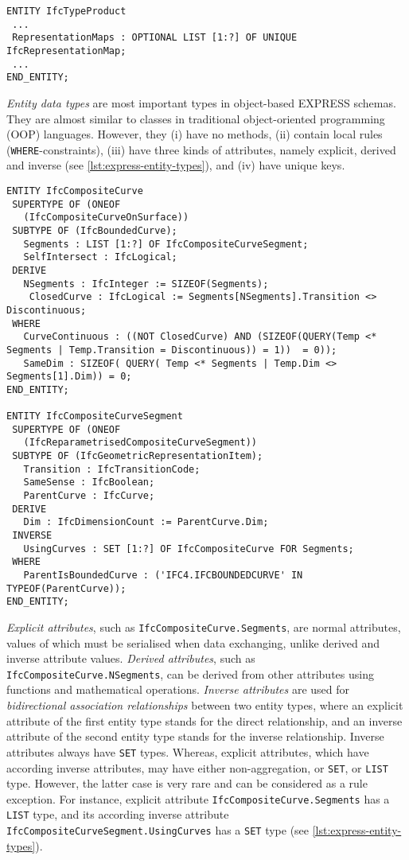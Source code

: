 \begin{lstlisting}[caption={Example of \texttt{LIST} type with unique items},label=lst:express-aggregation-types]
ENTITY IfcTypeProduct
 ...
 RepresentationMaps : OPTIONAL LIST [1:?] OF UNIQUE IfcRepresentationMap;
 ...	
END_ENTITY;
\end{lstlisting}



% 
% 
\emph{Entity data types} are most important types in object-based EXPRESS schemas.
They are almost similar to classes in traditional object-oriented programming (OOP) languages.
However, they (i) have no methods, (ii) contain local rules (\texttt{WHERE}-constraints), 
(iii) have three kinds of attributes, namely explicit, derived and inverse (see \autoref{lst:express-entity-types}),
and (iv) have unique keys.


\begin{lstlisting}[caption={Examples of EXPRESS entity types},label=lst:express-entity-types]
ENTITY IfcCompositeCurve
 SUPERTYPE OF (ONEOF
   (IfcCompositeCurveOnSurface))
 SUBTYPE OF (IfcBoundedCurve);
   Segments : LIST [1:?] OF IfcCompositeCurveSegment;
   SelfIntersect : IfcLogical;
 DERIVE
   NSegments : IfcInteger := SIZEOF(Segments);
	ClosedCurve : IfcLogical := Segments[NSegments].Transition <> Discontinuous;
 WHERE
   CurveContinuous : ((NOT ClosedCurve) AND (SIZEOF(QUERY(Temp <* Segments | Temp.Transition = Discontinuous)) = 1))  = 0));
   SameDim : SIZEOF( QUERY( Temp <* Segments | Temp.Dim <> Segments[1].Dim)) = 0;
END_ENTITY;

ENTITY IfcCompositeCurveSegment
 SUPERTYPE OF (ONEOF
   (IfcReparametrisedCompositeCurveSegment))
 SUBTYPE OF (IfcGeometricRepresentationItem);
   Transition : IfcTransitionCode;
   SameSense : IfcBoolean;
   ParentCurve : IfcCurve;
 DERIVE
   Dim : IfcDimensionCount := ParentCurve.Dim;
 INVERSE
   UsingCurves : SET [1:?] OF IfcCompositeCurve FOR Segments;
 WHERE
   ParentIsBoundedCurve : ('IFC4.IFCBOUNDEDCURVE' IN TYPEOF(ParentCurve));
END_ENTITY;
\end{lstlisting}  


\emph{Explicit attributes}, such as \texttt{Ifc\-Com\-po\-site\-Cur\-ve.Seg\-ments}, are normal attributes, values of which must be serialised when data exchanging, unlike derived and inverse attribute values.
\emph{Derived attributes}, such as \texttt{IfcCompositeCurve.NSegments}, can be derived from other attributes using functions and mathematical operations.
\emph{Inverse attributes} are used for \emph{bidirectional association relationships} between two entity types, where an explicit attribute of the first entity type stands for the direct relationship, and an inverse attribute of the second entity type stands for the inverse relationship.
Inverse attributes always have \texttt{SET} types.
Whereas, explicit attributes, which have according inverse attributes, may have either non-aggregation, or \texttt{SET}, or \texttt{LIST} type.
However, the latter case is very rare and can be considered as a rule exception.
For instance, explicit attribute \texttt{IfcCompositeCurve.Segments} has a \texttt{LIST} type, and its according inverse attribute \texttt{IfcCompositeCurveSegment.UsingCurves} has a \texttt{SET} type (see \autoref{lst:express-entity-types}).


